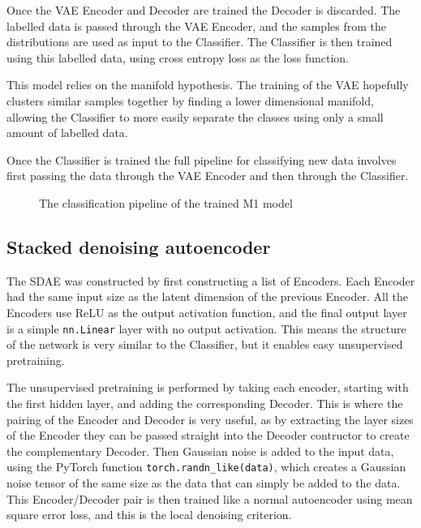 Once the VAE Encoder and Decoder are trained the Decoder is discarded. The labelled data is passed through the VAE Encoder, and the samples
from the distributions are used as input to the Classifier. The Classifier is then trained using this labelled data, using cross entropy 
loss as the loss function. 

This model relies on the manifold hypothesis. The training of the VAE hopefully clusters similar samples together by finding a lower
dimensional manifold, allowing the Classifier to more easily separate the classes using only a small amount of labelled data.

Once the Classifier is trained the full pipeline for classifying new data involves first passing the data 
through the VAE Encoder and then through the Classifier.

\begin{figure}[H]
  \centering
  \caption{The classification pipeline of the trained M1 model}
\end{figure}

\subsection{Stacked denoising autoencoder}
The SDAE was constructed by first constructing a list of Encoders. Each Encoder had the same input size as the latent dimension of the 
previous Encoder. All the Encoders use ReLU as the output activation function, and the final output layer is a simple \texttt{nn.Linear} layer with 
no output activation. This means the structure of the network is very similar to the Classifier, but it enables easy unsupervised pretraining.

The unsupervised pretraining is performed by taking each encoder, starting with the first hidden layer, and adding the corresponding 
Decoder. This is where the pairing of the Encoder and Decoder is very useful, as by extracting the layer sizes of the Encoder they 
can be passed straight into the Decoder contructor to create the complementary Decoder. Then Gaussian noise is added to the input data,
using the PyTorch function \texttt{torch.randn\_like(data)}, which creates a Gaussian noise tensor of the same size as the data that can
simply be added to the data. This Encoder/Decoder pair is then trained like a normal autoencoder using mean square error loss, and 
this is the local denoising criterion.

